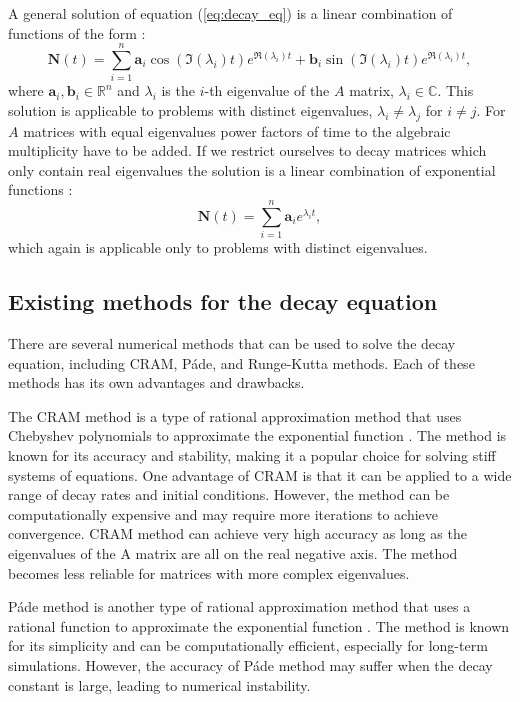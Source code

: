 \documentclass[10pt]{article}
\begin{document}
A general solution of equation (\ref{eq:decay_eq}) is a linear combination of functions of the form \cite{cit:decay_equation_CRAM_Pade}:
\begin{equation}\label{eq:complex_sol}
    \mathbf{N}(t) = \sum_{i=1}^n \mathbf{a}_i\cos(\Im(\lambda_i)t)e^{\Re(\lambda_i)t}+\mathbf{b}_i\sin(\Im(\lambda_i)t)e^{\Re(\lambda_i)t},
\end{equation}
where $\mathbf{a}_i, \mathbf{b}_i \in \mathbb{R}^n$ and $\lambda_i$ is the $i$-th eigenvalue of the $A$ matrix, $\lambda_i \in \mathbb{C}$. This solution is applicable to problems with distinct eigenvalues, $\lambda_i \neq \lambda_j$ for $i \neq j$. For $A$ matrices with equal eigenvalues power factors of time to the algebraic multiplicity have to be added. If we restrict ourselves to decay matrices which only contain real eigenvalues the solution is a linear combination of exponential functions \cite{cit:decay_equation_CRAM_Pade}:
\begin{equation}\label{eq:real_sol}
    \mathbf{N}(t) = \sum_{i=1}^n \mathbf{a}_i e^{\lambda_i t},
\end{equation}
which again is applicable only to problems with distinct eigenvalues. 

\subsection{Existing methods for the decay equation}
There are several numerical methods that can be used to solve the decay equation, including CRAM, P\'ade, and Runge-Kutta methods. Each of these methods has its own advantages and drawbacks.

The CRAM method is a type of rational approximation method that uses Chebyshev polynomials to approximate the exponential function \cite{cit:decay_equation_CRAM_Pade}. The method is known for its accuracy and stability, making it a popular choice for solving stiff systems of equations. One advantage of CRAM is that it can be applied to a wide range of decay rates and initial conditions. However, the method can be computationally expensive and may require more iterations to achieve convergence. CRAM method can achieve very high accuracy as long as the eigenvalues of the A matrix are all on the real negative axis. The method becomes less reliable for matrices with more complex eigenvalues.

P\'ade method is another type of rational approximation method that uses a rational function to approximate the exponential function \cite{cit:decay_equation_CRAM_Pade}. The method is known for its simplicity and can be computationally efficient, especially for long-term simulations. However, the accuracy of P\'ade method may suffer when the decay constant is large, leading to numerical instability.
\end{document}
